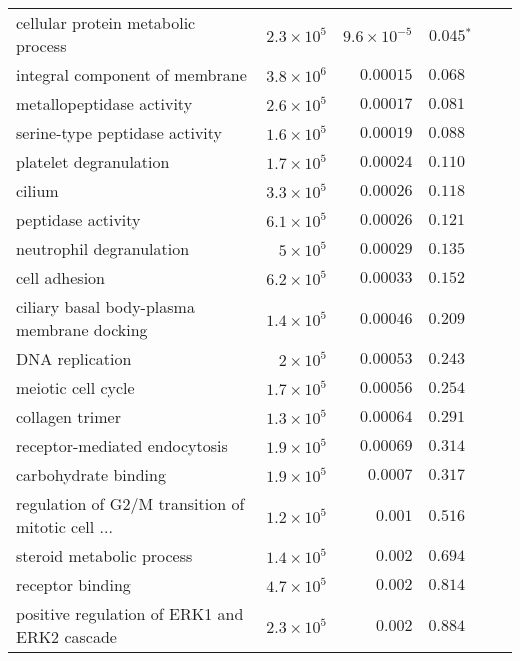 \begin{longtable}{|l|r|r|r|r|r|}
                cellular protein metabolic process & $2.3\times 10^{5}$ &  $9.6\times 10^{-5}$ &              $\bm{ 0.045{^*}}$ \\
                    integral component of membrane & $3.8\times 10^{6}$ &            $0.00015$ &                     $ 0.068~~$ \\
                         metallopeptidase activity & $2.6\times 10^{5}$ &            $0.00017$ &                     $ 0.081~~$ \\
                    serine-type peptidase activity & $1.6\times 10^{5}$ &            $0.00019$ &                     $ 0.088~~$ \\
                            platelet degranulation & $1.7\times 10^{5}$ &            $0.00024$ &                     $ 0.110~~$ \\
                                            cilium & $3.3\times 10^{5}$ &            $0.00026$ &                     $ 0.118~~$ \\
                                peptidase activity & $6.1\times 10^{5}$ &            $0.00026$ &                     $ 0.121~~$ \\
                          neutrophil degranulation &  $ 5\times 10^{5}$ &            $0.00029$ &                     $ 0.135~~$ \\
                                     cell adhesion & $6.2\times 10^{5}$ &            $0.00033$ &                     $ 0.152~~$ \\
        ciliary basal body-plasma membrane docking & $1.4\times 10^{5}$ &            $0.00046$ &                     $ 0.209~~$ \\
                                   DNA replication &  $ 2\times 10^{5}$ &            $0.00053$ &                     $ 0.243~~$ \\
                                meiotic cell cycle & $1.7\times 10^{5}$ &            $0.00056$ &                     $ 0.254~~$ \\
                                   collagen trimer & $1.3\times 10^{5}$ &            $0.00064$ &                     $ 0.291~~$ \\
                     receptor-mediated endocytosis & $1.9\times 10^{5}$ &            $0.00069$ &                     $ 0.314~~$ \\
                              carbohydrate binding & $1.9\times 10^{5}$ &             $0.0007$ &                     $ 0.317~~$ \\
 regulation of G2/M transition of mitotic cell ... & $1.2\times 10^{5}$ &             $ 0.001$ &                     $ 0.516~~$ \\
                         steroid metabolic process & $1.4\times 10^{5}$ &             $ 0.002$ &                     $ 0.694~~$ \\
                                  receptor binding & $4.7\times 10^{5}$ &             $ 0.002$ &                     $ 0.814~~$ \\
      positive regulation of ERK1 and ERK2 cascade & $2.3\times 10^{5}$ &             $ 0.002$ &                     $ 0.884~~$ \\
\end{longtable}

